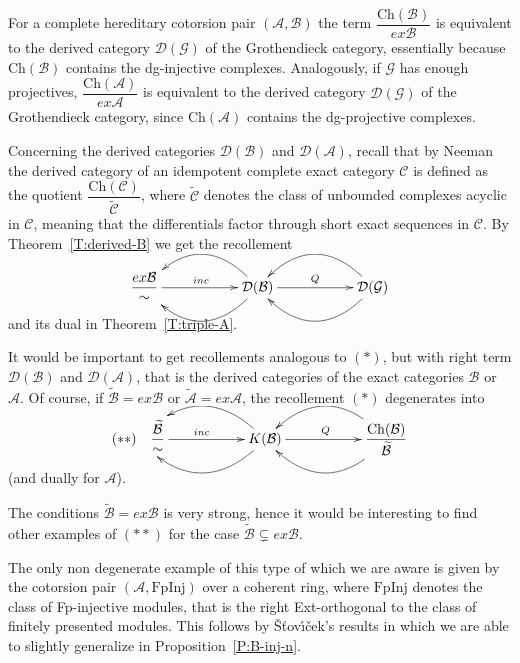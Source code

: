 \documentclass[11pt,a4paper,reqno]{amsart}
\newcommand{\sto}{ {\v{S}}{\v{t}}ov{\'{\i}}{\v{c}}ek}
\newcommand{\A}{\mathcal{A}}
\newcommand{\B}{\mathcal{B}}
\newcommand{\C}{\mathcal{C}}
\newcommand{\D}{\mathcal{D}}
\newcommand{\G}{\mathcal{G}}
\newcommand{\Ch}{\mathrm{Ch}}
\newcommand{\FpInj}{\mathrm{FpInj}}
\theoremstyle{plain}
\theoremstyle{definition}
\theoremstyle{remark}
\begin{document}

For a complete hereditary cotorsion pair $(\A, \B)$ the term $\dfrac{\Ch(\B)}{ex\B }$ is equivalent to the derived category $\D(\G)$ of the Grothendieck category, essentially because $\Ch(\B)$ contains the dg-injective complexes. Analogously, if $\G$ has enough projectives, $\dfrac{\Ch(\A)}{ex\A}$ is equivalent to the derived category $\D(\G)$ of the Grothendieck category, since $\Ch(\A)$ contains the dg-projective complexes.

Concerning the derived categories $\D(\B)$ and $\D(\A)$, recall that
by Neeman~\cite{Nee90} the derived category of an idempotent complete exact category $\C$ is defined as the quotient $\dfrac{\Ch(\C)}{\widetilde{\C}}$, where $\widetilde{\C}$ denotes the class of unbounded complexes acyclic in $\C$, meaning that the differentials factor through short exact sequences in $\C$. By Theorem~\ref{T:derived-B} we get the recollement

\vskip0.7cm
\[
\xymatrix{\dfrac{ex\B}{\sim} \ar[rr]^{inc} &&{\D(\B)} \ar@/^2pc/[ll]\ar@/_2pc/[ll] \ar[rr]^{Q}
                                           &&{\D(\G)}\ar@/^2pc/ [ll] \ar@/_2pc/ [ll] }
\]
\vskip0.7cm
and its dual in Theorem~\ref{T:triple-A}.

It would be important to get recollements analogous to $(\ast)$, but with right term $\D(\B)$ and $\D(\A)$, that is the derived categories of the exact categories $\B$ or $\A$. Of course, if $\widetilde{\B}=ex\B$ or $\widetilde{\A}=ex{\A}$, the recollement $(\ast)$ degenerates into
\vskip0.7cm
\[
  \xymatrix{(\ast \ast)\quad \dfrac{\widetilde{\B}}{\sim} \ar[rr]^{inc} &&{K(\B)} \ar@/^2pc/[ll]\ar@/_2pc/[ll] \ar[rr]^{Q}
&&{\dfrac{\Ch(\B)}{\widetilde{\B} }}\ar@/^2pc/ [ll] \ar@/_2pc/ [ll] }
\]
\vskip0.7cm
(and dually for $\A$).


The conditions $\widetilde{\B}=ex\B$ is very strong, hence it would be interesting to find other examples of $(\ast \ast)$ for the case $\widetilde{\B}\subsetneq ex\B$.

The only non degenerate example of this type of which we are aware is given by the cotorsion pair $(\A, \FpInj)$ over a coherent ring, where $\FpInj$ denotes the class of Fp-injective modules, that is the right Ext-orthogonal to the class of finitely presented modules. This follows by \sto's results in \cite{sto14} which we are able to slightly generalize in Proposition~\ref{P:B-inj-n}.
\end{document}
